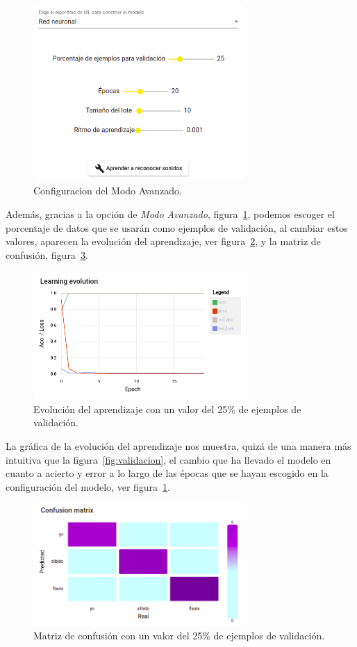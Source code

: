 \documentclass[a4paper, 12pt]{book}
\begin{document}
\begin{figure}
	\centering
	\includegraphics[width=8cm, keepaspectratio]{img/configuracion-25.png}
	\caption{Configuracion del Modo Avanzado.}\label{fig:configuracion}
\end{figure}

Además, gracias a la opción de \textit{Modo Avanzado}, figura~\ref{fig:configuracion}, podemos escoger el porcentaje de datos que se usarán como ejemplos de validación, al cambiar estos valores, aparecen la evolución del aprendizaje, ver figura~\ref{fig:learning-evolution}, y la matriz de confusión, figura~\ref{fig:matriz-confusion}.

\begin{figure}
	\centering
	\includegraphics[width=8cm, keepaspectratio]{img/learning-evolution-25.png}
	\caption{Evolución del aprendizaje con un valor del 25\% de ejemplos de validación.}\label{fig:learning-evolution}
\end{figure}

La gráfica de la evolución del aprendizaje nos muestra, quizá de una manera más intuitiva que la figura~\ref{fig:validacion}, el cambio que ha llevado el modelo en cuanto a acierto y error a lo largo de las épocas que se hayan escogido en la configuración del modelo, ver figura~\ref{fig:configuracion}.

\begin{figure}
	\centering
	\includegraphics[width=8cm, keepaspectratio]{img/confusion-matrix-25.png}
	\caption{Matriz de confusión con un valor del 25\% de ejemplos de validación.}\label{fig:matriz-confusion}
\end{figure}
\end{document}
